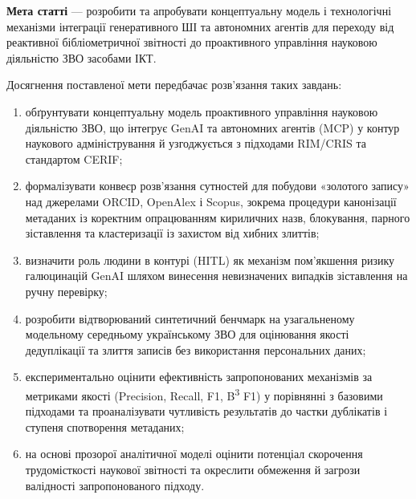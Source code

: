 \textbf{Мета статті} --- розробити та апробувати концептуальну модель і технологічні механізми інтеграції генеративного ШІ та автономних агентів для переходу від реактивної бібліометричної звітності до проактивного управління науковою діяльністю ЗВО засобами ІКТ.

Досягнення поставленої мети передбачає розв'язання таких завдань:

\begin{enumerate}
    \item обґрунтувати концептуальну модель проактивного управління науковою діяльністю ЗВО, що інтегрує GenAI та автономних агентів (MCP) у контур наукового адміністрування й узгоджується з підходами RIM/CRIS та стандартом CERIF;
    \item формалізувати конвеєр розв'язання сутностей для побудови «золотого запису» над джерелами ORCID, OpenAlex і Scopus, зокрема процедури канонізації метаданих із коректним опрацюванням кириличних назв, блокування, парного зіставлення та кластеризації із захистом від хибних злиттів;
    \item визначити роль людини в контурі (HITL) як механізм пом'якшення ризику галюцинацій GenAI шляхом винесення невизначених випадків зіставлення на ручну перевірку;
    \item розробити відтворюваний синтетичний бенчмарк на узагальненому модельному середньому українському ЗВО для оцінювання якості дедуплікації та злиття записів без використання персональних даних;
    \item експериментально оцінити ефективність запропонованих механізмів за метриками якості (Precision, Recall, F1, B\textsuperscript{3} F1) у порівнянні з базовими підходами та проаналізувати чутливість результатів до частки дублікатів і ступеня спотворення метаданих;
    \item на основі прозорої аналітичної моделі оцінити потенціал скорочення трудомісткості наукової звітності та окреслити обмеження й загрози валідності запропонованого підходу.
\end{enumerate}